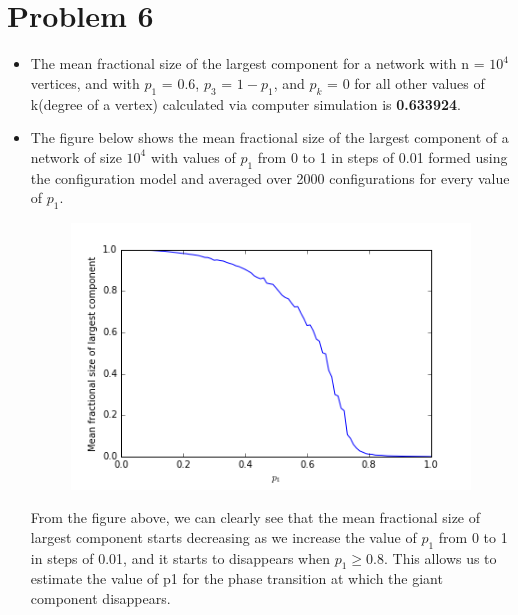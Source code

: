\documentclass{article}
\begin{document}
\section*{Problem 6}
\begin{itemize}
\item
The mean fractional size of the largest component for a network with n = $10^4$ vertices, and with $p_1$ = 0.6, $p_3$ = $1-p_1$, and $p_k$ = 0 for all other values of k(degree of a vertex) calculated via computer simulation is \textbf{0.633924}.
\item
The figure below shows the mean fractional size of the largest component of a network of size $10^4$ with values of $p_1$ from 0 to 1 in steps of 0.01 formed using the configuration model and averaged over 2000 configurations for every value of $p_1$.\\
\begin{figure}[H]
  \centering
  \begin{minipage}[b]{0.6\textwidth}
    \includegraphics[width=\textwidth]{images/p6.png}
  \end{minipage}
\end{figure}
From the figure above, we can clearly see that the mean fractional size of largest component starts  decreasing as we increase the value of $p_1$ from 0 to 1 in steps of 0.01, and it starts to disappears when $p_1 \geq 0.8$. This allows us to estimate the value of p1 for the phase transition at which the giant component disappears.  
\end{itemize}
\newpage
\end{document}

